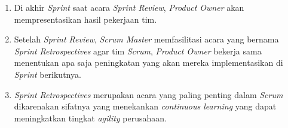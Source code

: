 \begin {enumerate}[1.]
\item Di akhir \textit{Sprint} saat acara \textit{Sprint Review}, \textit{Product Owner} akan mempresentasikan hasil pekerjaan tim.
\item Setelah \textit{Sprint Review}, \textit{Scrum Master} memfasilitasi acara yang bernama \textit{Sprint Retrospectives} agar tim \textit{Scrum}, \textit{Product Owner} bekerja sama menentukan apa saja peningkatan yang akan mereka implementasikan di \textit{Sprint} berikutnya.
\item \textit{Sprint Retrospectives} merupakan acara yang paling penting dalam \textit{Scrum} dikarenakan sifatnya yang menekankan \textit{continuous learning} yang dapat meningkatkan tingkat \textit{agility} perusahaan. \
\end{enumerate}

